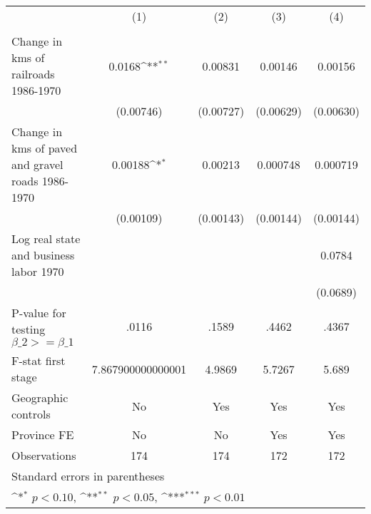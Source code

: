 {
\def\sym#1{\ifmmode^{#1}\else\(^{#1}\)\fi}
\begin{tabular}{l*{4}{c}}
\hline\hline
                &\multicolumn{1}{c}{(1)}&\multicolumn{1}{c}{(2)}&\multicolumn{1}{c}{(3)}&\multicolumn{1}{c}{(4)}\\
                &\multicolumn{1}{c}{}&\multicolumn{1}{c}{}&\multicolumn{1}{c}{}&\multicolumn{1}{c}{}\\
\hline
Change in kms of railroads 1986-1970&   0.0168\sym{**} &  0.00831         &  0.00146         &  0.00156         \\
                &(0.00746)         &(0.00727)         &(0.00629)         &(0.00630)         \\
[1em]
Change in kms of paved and gravel roads 1986-1970&  0.00188\sym{*}  &  0.00213         & 0.000748         & 0.000719         \\
                &(0.00109)         &(0.00143)         &(0.00144)         &(0.00144)         \\
[1em]
Log real state and business labor 1970&                  &                  &                  &   0.0784         \\
                &                  &                  &                  & (0.0689)         \\
\hline
P-value for testing $\beta\_{2} >= \beta\_{1}$&    .0116         &    .1589         &    .4462         &    .4367         \\
F-stat first stage&7.867900000000001         &   4.9869         &   5.7267         &    5.689         \\
Geographic controls&       No         &      Yes         &      Yes         &      Yes         \\
Province FE     &       No         &       No         &      Yes         &      Yes         \\
Observations    &      174         &      174         &      172         &      172         \\
\hline\hline
\multicolumn{5}{l}{\footnotesize Standard errors in parentheses}\\
\multicolumn{5}{l}{\footnotesize \sym{*} \(p<0.10\), \sym{**} \(p<0.05\), \sym{***} \(p<0.01\)}\\
\end{tabular}
}
